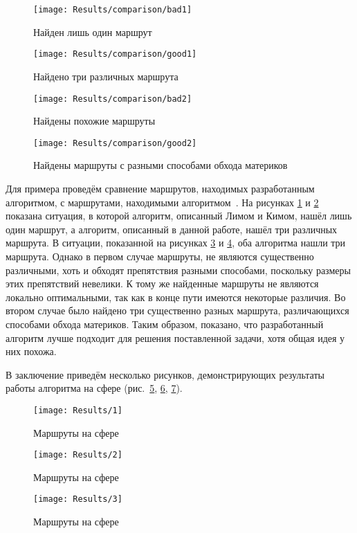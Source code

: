 \begin{figure}
    \texttt{[image: Results/comparison/bad1]}
    \caption{Найден лишь один маршрут}
    \label{fig:res-comp-bad1}
\end{figure}

\begin{figure}
    \texttt{[image: Results/comparison/good1]}
    \caption{Найдено три различных маршрута}
    \label{fig:res-comp-good1}
\end{figure}

\begin{figure}
    \texttt{[image: Results/comparison/bad2]}
    \caption{Найдены похожие маршруты}
    \label{fig:res-comp-bad2}
\end{figure}

\begin{figure}
    \texttt{[image: Results/comparison/good2]}
    \caption{Найдены маршруты с разными способами обхода материков}
    \label{fig:res-comp-good2}
\end{figure}

Для примера проведём сравнение маршрутов, находимых разработанным
алгоритмом, с маршрутами, находимыми
алгоритмом~\cite{lim2005shortest}. На рисунках \ref{fig:res-comp-bad1}
и \ref{fig:res-comp-good1} показана ситуация, в которой алгоритм,
описанный Лимом и Кимом, нашёл лишь один маршрут, а алгоритм,
описанный в данной работе, нашёл три различных маршрута. В ситуации,
показанной на рисунках \ref{fig:res-comp-bad2} и
\ref{fig:res-comp-good2}, оба алгоритма нашли три маршрута. Однако в
первом случае маршруты, не являются существенно различными, хоть и
обходят препятствия разными способами, поскольку размеры этих
препятствий невелики. К тому же найденные маршруты не являются
локально оптимальными, так как в конце пути имеются некоторые
различия. Во втором случае было найдено три существенно разных
маршрута, различающихся способами обхода материков. Таким образом,
показано, что разработанный алгоритм лучше подходит для решения
поставленной задачи, хотя общая идея у них похожа.

В заключение приведём несколько рисунков, демонстрирующих результаты
работы алгоритма на сфере (рис.~\ref{fig:result1}, \ref{fig:result2}, \ref{fig:result3}).

\begin{figure}
    \texttt{[image: Results/1]}
    \caption{Маршруты на сфере}
    \label{fig:result1}
\end{figure}

\begin{figure}
    \texttt{[image: Results/2]}
    \caption{Маршруты на сфере}
    \label{fig:result2}
\end{figure}

\begin{figure}
    \texttt{[image: Results/3]}
    \caption{Маршруты на сфере}
    \label{fig:result3}
\end{figure}

\FloatBarrier

